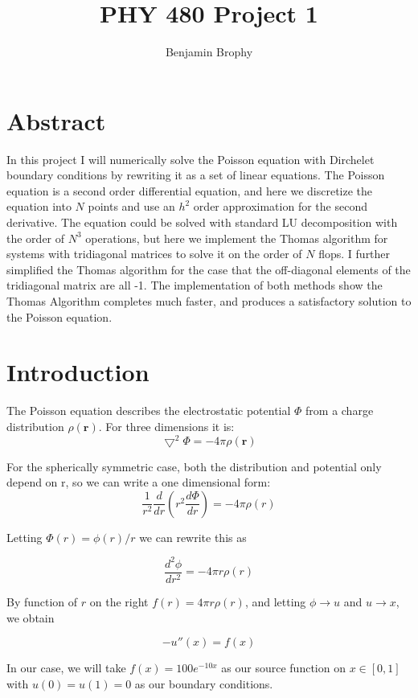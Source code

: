 \documentclass[11pt]{article}
\begin{document}
\title{PHY 480 Project 1}
\author{Benjamin Brophy}
\maketitle

\section{Abstract}

In this project I will numerically solve the Poisson equation with Dirchelet boundary conditions by rewriting it as a set of linear equations. The Poisson equation is a second order differential equation, and here we discretize the equation into $N$ points and use an $h^2$ order approximation for the second derivative. The equation could be solved with standard LU decomposition with the order of $N^3$ operations, but here we implement the Thomas algorithm for systems with tridiagonal matrices to solve it on the order of $N$ flops. I further simplified the Thomas algorithm for the case that the off-diagonal elements of the tridiagonal matrix are all -1. The implementation of both methods show the Thomas Algorithm completes much faster, and produces a satisfactory solution to the Poisson equation.

\section{Introduction}
The Poisson equation describes the electrostatic potential $\Phi$ from a charge distribution $\rho(\mathbf{r})$. For three dimensions it is:
$$ \bigtriangledown^2\Phi = -4\pi \rho (\mathbf{r})$$

For the spherically symmetric case, both the distribution and potential only depend on r, so we can write a one dimensional form:
$$\frac{1}{r^2}\frac{d}{dr}\left(r^2\frac{d\Phi}{dr}\right)=-4\pi\rho(r)$$

Letting $\Phi(r) = \phi(r)/r$ we can rewrite this as 

$$\frac{d^2\phi}{dr^2}=-4\pi r\rho(r)$$

By function of $r$ on the right $f(r)=4\pi r\rho(r)$,  and letting $\phi \rightarrow u$ and $u \rightarrow x$, we obtain

$$-u''(x)=f(x)$$

In our case, we will take $f(x)=100e^{-10x}$ as our source function on $x\in[0,1]$ with $u(0)=u(1)=0$ as our boundary conditions.
\end{document}
